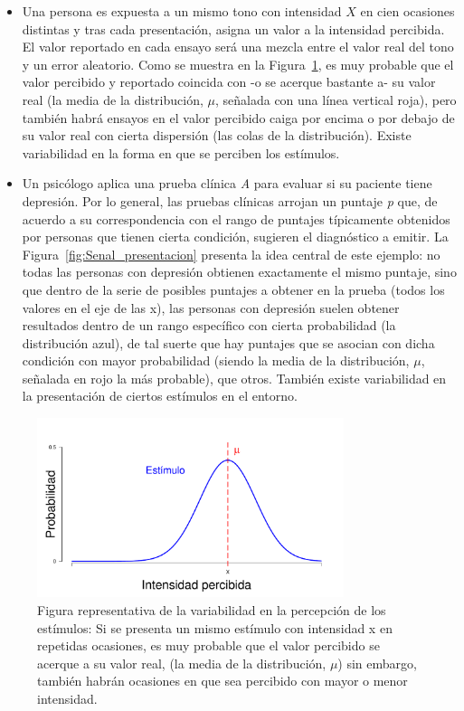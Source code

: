 \begin{itemize}
\item Una persona es expuesta a un mismo tono con intensidad $X$ en cien ocasiones distintas y tras cada presentación, asigna un valor a la intensidad percibida. El valor reportado en cada ensayo será una mezcla entre el valor real del tono y un error aleatorio. Como se muestra en la Figura~\ref{fig:Senal_percepcion}, es muy probable que el valor percibido y reportado coincida con -o se acerque bastante a- su valor real (la media de la distribución, $\mu$, señalada con una línea vertical roja), pero también habrá ensayos en el valor percibido caiga por encima o por debajo de su valor real con cierta dispersión (las colas de la distribución). Existe variabilidad en la forma en que se perciben los estímulos.\\

\item Un psicólogo aplica una prueba clínica \textit{A} para evaluar si su paciente tiene depresión. Por lo general, las pruebas clínicas arrojan un puntaje \textit{p} que, de acuerdo a su correspondencia con el rango de puntajes típicamente obtenidos por personas que tienen cierta condición, sugieren el diagnóstico a emitir. La Figura~\ref{fig:Senal_presentacion} presenta la idea central de este ejemplo: no todas las personas con depresión obtienen exactamente el mismo puntaje, sino que dentro de la serie de posibles puntajes a obtener en la prueba (todos los valores en el eje de las x), las personas con depresión suelen obtener resultados dentro de un rango específico con cierta probabilidad (la distribución azul), de tal suerte que hay puntajes que se asocian con dicha condición con mayor probabilidad (siendo la media de la distribución, $\mu$, señalada en rojo la más probable), que otros. También existe variabilidad en la presentación de ciertos estímulos en el entorno.\\
\end{itemize}

\begin{figure}[th]
\centering
\includegraphics[width=0.80\textwidth]{Figures/Signal_Perception} 
\caption[Variabilidad en la percepción de los estímulos]{Figura representativa de la variabilidad en la percepción de los estímulos: Si se presenta un mismo estímulo con intensidad x en repetidas ocasiones, es muy probable que el valor percibido se acerque a su valor real, (la media de la distribución, $\mu$) sin embargo, también habrán ocasiones en que sea percibido con mayor o menor intensidad.}
\label{fig:Senal_percepcion}
\end{figure}


